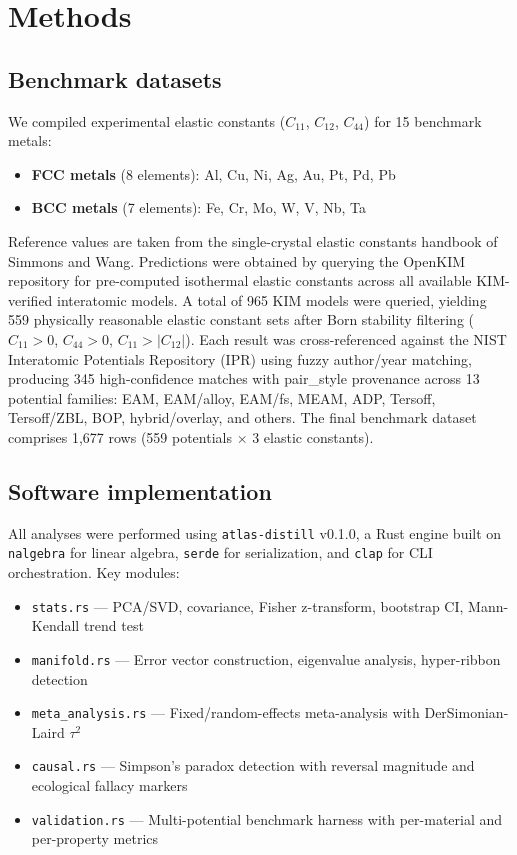 \documentclass[twocolumn,9pt]{extarticle}
\begin{document}
\section{Methods}

\subsection{Benchmark datasets}

We compiled experimental elastic constants ($C_{11}$, $C_{12}$, $C_{44}$) for 15 benchmark metals:
\begin{itemize}
\item \textbf{FCC metals} (8 elements): Al, Cu, Ni, Ag, Au, Pt, Pd, Pb
\item \textbf{BCC metals} (7 elements): Fe, Cr, Mo, W, V, Nb, Ta
\end{itemize}
Reference values are taken from the single-crystal elastic constants handbook of Simmons and Wang\cite{simmons1971}. Predictions were obtained by querying the OpenKIM repository\cite{openkim} for pre-computed isothermal elastic constants across all available KIM-verified interatomic models. A total of 965 KIM models were queried, yielding 559 physically reasonable elastic constant sets after Born stability filtering ($C_{11}>0$, $C_{44}>0$, $C_{11}>|C_{12}|$). Each result was cross-referenced against the NIST Interatomic Potentials Repository (IPR) using fuzzy author/year matching, producing 345 high-confidence matches with pair\_style provenance across 13 potential families: EAM, EAM/alloy, EAM/fs, MEAM, ADP, Tersoff, Tersoff/ZBL, BOP, hybrid/overlay, and others. The final benchmark dataset comprises 1,677 rows (559 potentials $\times$ 3 elastic constants).

\subsection{Software implementation}

All analyses were performed using \texttt{atlas-distill} v0.1.0, a Rust engine built on \texttt{nalgebra} for linear algebra, \texttt{serde} for serialization, and \texttt{clap} for CLI orchestration. Key modules:
\begin{itemize}
\item \texttt{stats.rs} --- PCA/SVD, covariance, Fisher z-transform, bootstrap CI, Mann-Kendall trend test
\item \texttt{manifold.rs} --- Error vector construction, eigenvalue analysis, hyper-ribbon detection
\item \texttt{meta\_analysis.rs} --- Fixed/random-effects meta-analysis with DerSimonian-Laird $\tau^2$
\item \texttt{causal.rs} --- Simpson's paradox detection with reversal magnitude and ecological fallacy markers
\item \texttt{validation.rs} --- Multi-potential benchmark harness with per-material and per-property metrics
\end{itemize}
\end{document}
